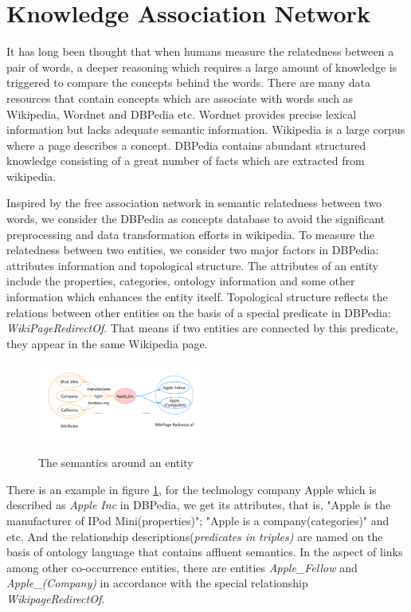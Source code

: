 \section{Knowledge Association Network}
\label{kan}
It has long been thought that when humans measure the relatedness between a pair of words,
a deeper reasoning which requires a large amount of knowledge is triggered to compare the concepts behind the words.
There are many data resources that contain concepts which are associate with words such as Wikipedia, Wordnet and DBPedia etc.
Wordnet provides precise lexical information but lacks adequate semantic information.
Wikipedia is a large corpus where a page describes a concept.
DBPedia contains abundant structured knowledge consisting of a great number of facts which are extracted from wikipedia. 

Inspired by the free association network in semantic relatedness between two words\cite{aaai/GongXH18,aaai/ZhangZH15}, 
we consider the DBPedia as concepts database to avoid the significant preprocessing and data transformation efforts in wikipedia. 
To measure the relatedness between two entities, we consider two major factors in DBPedia: attributes information and topological structure. 
The attributes of an entity include the properties, categories, ontology information and some other information which enhances
the entity itself. Topological structure reflects the relations between other
entities on the basis of a special predicate in DBPedia: \emph{WikiPageRedirectOf}.
That means if two entities are connected by this predicate, they appear in the same Wikipedia page.

\begin{figure}
    \flushleft
    \includegraphics[width=0.5\textwidth]{pic/kg.pdf}\\
    \caption{The semantics around an entity}
    \label{kg}
\end{figure}

There is an example in figure \ref{kg}, for the technology company Apple which is described
as \emph{Apple Inc} in DBPedia, we get its attributes, that is, "Apple is the manufacturer of IPod Mini(properties)"; "Apple is a company(categories)" and etc.
And the relationship descriptions(\emph{predicates in triples)} are named on the basis of ontology language that contains affluent semantics.
In the aspect of links among other co-occurrence entities, there are entities \emph{Apple\_Fellow} and \emph{Apple\_(Company)} in accordance with the
special relationship \emph{WikipageRedirectOf}.


